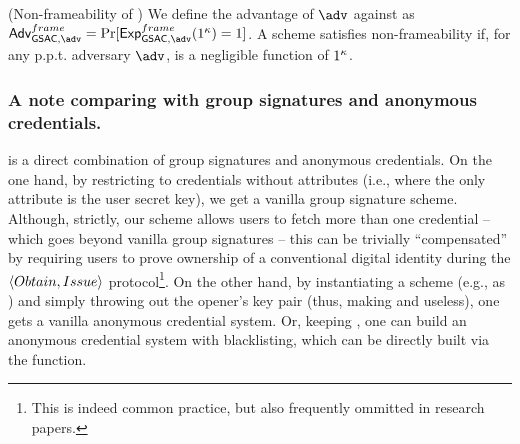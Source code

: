 \begin{definition}{(Non-frameability of \GSAC)}
  \label{def:frame-gsac}
  We define the advantage \AdvGSACNonframe of $\adv$ against \ExpGSACNonframe as
  $\AdvGSACNonframe=\Pr\lbrack\ExpGSACNonframe(1^\secpar)=1\rbrack$.
  A \GSAC scheme satisfies non-frameability if, for any p.p.t. adversary $\adv$,
  \AdvNonframe is a negligible function of $1^\kappa$.
\end{definition}

\subsubsection{A note comparing \GSAC with group signatures and
  anonymous credentials.} %

\GSAC is a direct combination of group signatures and anonymous credentials.
%
On the one hand, by restricting to credentials without attributes (i.e., where
the only attribute is the user secret key), we get a vanilla group signature
scheme. Although, strictly, our scheme allows users to fetch more than one
credential -- which goes beyond vanilla group signatures -- this can be
trivially ``compensated'' by requiring users to prove ownership of a
conventional digital identity during the $\langle Obtain,Issue \rangle$
protocol\footnote{This is indeed common practice, but also frequently ommitted
  in research papers.}.
%
On the other hand, by instantiating a \GSAC scheme (e.g., as \GSACGen) and simply
throwing out the opener's key pair (thus, making \Open and \Judge useless), one
gets a vanilla anonymous credential system. Or, keeping \osk, one can build an
anonymous credential system with blacklisting, which can be directly built via
the \Open function.


\iffalse
\todo{Modelling choices: HU and CU lists are typically updated in join protocols
  in the GS literature. Here, it is best to follow the AC literature, as a same
  user (key) may be associated to multiple join protocols. So there are HUGEN
  and CUGEN oracles.}

\todo{Other modelling choice: We could return the full set of attributes
  contained in the credential used for creating an opened signature, but that
  would require either complicating the proof, or access to the transcripts log
  at open time, which I opted to avoid for better compatibility with \UAS.}

\todo{It would be nice to prove that a \GSAC scheme to which we remove the
  \Open/\Judge functions becomes an AC scheme. And conversely, a \GSAC scheme
  where all credentials have no attributes, and where we restrict to only
  one credential per user, becomes a conventional GS scheme.}
\fi

